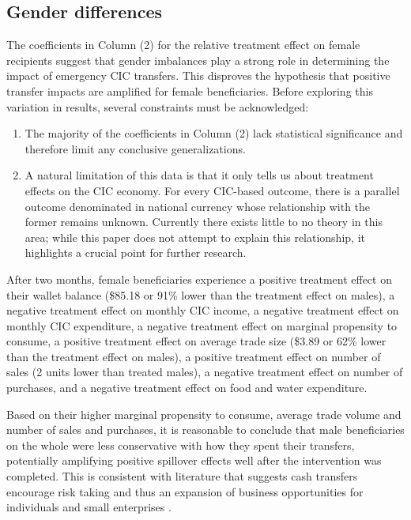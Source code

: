 \documentclass[12pt]{article}
\begin{document}
\subsection{Gender differences}
The coefficients in Column (2) for the relative treatment effect on female recipients suggest that gender imbalances play a strong role in determining the impact of emergency CIC transfers. This disproves the hypothesis that positive transfer impacts are amplified for female beneficiaries. Before exploring this variation in results, several constraints must be acknowledged:

\begin{enumerate}
    \item The majority of the coefficients in Column (2) lack statistical significance and therefore limit any conclusive generalizations.
    \item A natural limitation of this data is that it only tells us about treatment effects on the CIC economy. For every CIC-based outcome, there is a parallel outcome denominated in national currency whose relationship with the former remains unknown. Currently there exists little to no theory in this area; while this paper does not attempt to explain this relationship, it highlights a crucial point for further research.
\end{enumerate}

After two months, female beneficiaries experience a positive treatment effect on their wallet balance (\$85.18 or 91\% lower than the treatment effect on males), a negative treatment effect on monthly CIC income, a negative treatment effect on monthly CIC expenditure, a negative treatment effect on marginal propensity to consume, a positive treatment effect on average trade size (\$3.89 or 62\% lower than the treatment effect on males), a positive treatment effect on number of sales (2 units lower than treated males), a negative treatment effect on number of purchases, and a negative treatment effect on food and water expenditure.

Based on their higher marginal propensity to consume, average trade volume and number of sales and purchases, it is reasonable to conclude that male beneficiaries on the whole were less conservative with how they spent their transfers, potentially amplifying positive spillover effects well after the intervention was completed. This is consistent with literature that suggests cash transfers encourage risk taking and thus an expansion of business opportunities for individuals and small enterprises \citep{banerjee2020effects}.
\end{document}
